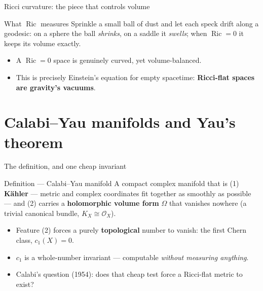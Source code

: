 \documentclass[aspectratio=169]{beamer}
\begin{document}
\begin{frame}{Ricci curvature: the piece that controls volume}
  \begin{block}{What $\operatorname{Ric}$ measures}
    Sprinkle a small ball of dust and let each speck drift along a
    geodesic: on a sphere the ball \emph{shrinks}, on a saddle it
    \emph{swells}; when $\operatorname{Ric} = 0$ it keeps its volume exactly.
  \end{block}
  \begin{itemize}
    \item A $\operatorname{Ric} = 0$ space is genuinely curved, yet
          volume-balanced.
    \item This is precisely Einstein's equation for empty spacetime:
          \textbf{Ricci-flat spaces are gravity's vacuums}.
  \end{itemize}
\end{frame}

\section{Calabi–Yau manifolds and Yau's theorem}

\begin{frame}{The definition, and one cheap invariant}
  \begin{block}{Definition — Calabi–Yau manifold}
    A compact complex manifold that is (1) \textbf{Kähler} — metric and
    complex coordinates fit together as smoothly as possible — and
    (2) carries a \textbf{holomorphic volume form} $\Omega$ that vanishes
    nowhere (a trivial canonical bundle, $K_X \cong \mathcal{O}_X$).
  \end{block}
  \begin{itemize}
    \item Feature (2) forces a purely \textbf{topological} number to vanish:
          the first Chern class, $c_1(X) = 0$.
    \item $c_1$ is a whole-number invariant — computable \emph{without
          measuring anything}.
    \item Calabi's question (1954): does that cheap test force a
          Ricci-flat metric to exist?
  \end{itemize}
\end{frame}
\end{document}

